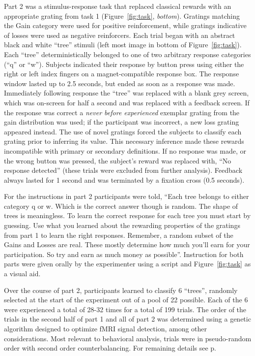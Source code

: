 Part 2 was a stimulus-response task that replaced classical rewards with an appropriate grating from task 1 (Figure~\ref{fig:task}, \emph{bottom}).  Gratings matching the Gain category were used for positive reinforcement, while gratings indicative of losses were used as negative reinforcers.   Each trial began with an abstract black and white ``tree'' stimuli (left most image in bottom of Figure~\ref{fig:task}).  Each ``tree'' deterministically belonged to one of two arbitrary response categories (``q'' or ``w'').  Subjects indicated their response by button press using either the right or left index fingers on a magnet-compatible response box.  The response window lasted up to 2.5 seconds, but ended as soon as a response was made.  Immediately following response the ``tree'' was replaced with a blank grey screen, which was on-screen for half a second and was replaced with a feedback screen.  If the response was correct a \emph{never before experienced} exemplar grating from the gain distribution was used; if the participant was incorrect, a new loss grating appeared instead.  The use of novel gratings forced the subjects to classify each grating prior to inferring its value.  This necessary inference made these rewards incompatible with primary or secondary definitions.  If no response was made, or the wrong button was pressed, the subject's reward was replaced with, ``No response detected'' (these trials were excluded from further analysis).  Feedback always lasted for 1 second and was terminated by a fixation cross (0.5 seconds).  

For the instructions in part 2 participants were told, ``Each tree belongs to either category q or w.  Which is the correct answer though is random.  The shape of trees is meaningless.  To learn the correct response for each tree you must start by guessing.  Use what you learned about the rewarding properties of the gratings from part 1 to learn the right responses.  Remember, a random subset of the Gains and Losses are real.  These mostly determine how much you'll earn for your participation.  So try and earn as much money as possible''.  Instruction for both parts were given orally by the experimenter using a script and Figure~\ref{fig:task} as a visual aid.

Over the course of part 2, participants learned to classify 6 ``trees'', randomly selected at the start of the experiment out of a pool of 22 possible.  Each of the 6 were experienced a total of 28-32 times for a total of 199 trials. The order of the trials in the second half of part 1 and all of part 2 was determined using a genetic algorithm designed to optimize fMRI signal detection, among other considerations.  Most relevant to behavioral analysis, trials were in pseudo-random order with second order counterbalancing.  For remaining details see p\pageref{sub:acquired}.


